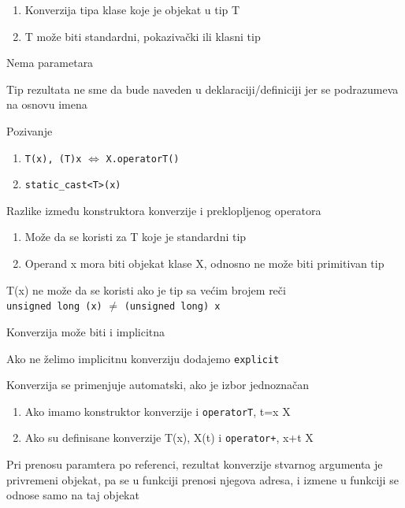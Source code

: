 \documentclass{article}
\newenvironment{xitemize}{%
    
    \itemize
    \larger
}{%
    \enditemize
}
\let\olditemize\itemize
\let\endolditemize\enditemize
\renewenvironment{itemize}{%
    \smaller
    \olditemize
}{%
    \endolditemize
}
\providecommand{\inlinecode}[1]{\texttt{#1}}
\begin{document}
\begin{xitemize}
\begin{itemize}
\item[]\begin{enumerate}
        \item Konverzija tipa klase koje je objekat u tip T
        \item T može biti standardni, pokazivački ili klasni tip
    \end{enumerate} 
    \item Nema parametara
    \item Tip rezultata ne sme da bude naveden u deklaraciji/definiciji jer se podrazumeva na osnovu imena
    \item Pozivanje
    \begin{enumerate}
        \item \inlinecode{T(x), (T)x} $\iff$ \inlinecode{X.operatorT()} 
        \item \inlinecode{static\_cast<T>(x)}
    \end{enumerate}
    \item Razlike između konstruktora konverzije i preklopljenog operatora
    \begin{enumerate}
        \item Može da se koristi za T koje je standardni tip
        \item Operand x mora biti objekat klase X, odnosno ne može biti primitivan tip
    \end{enumerate}
    \item T(x) ne može da se koristi ako je tip sa većim brojem reči\\
    \inlinecode{unsigned long (x)} $\neq$ \inlinecode{(unsigned long) x}
    \item Konverzija može biti i implicitna
    \item Ako ne želimo implicitnu konverziju dodajemo \inlinecode{explicit}
    \item Konverzija se primenjuje automatski, ako je izbor jednoznačan
    \begin{enumerate}
        \item Ako imamo konstruktor konverzije i \inlinecode{operatorT}, t=x X
        \item Ako su definisane konverzije T(x), X(t) i \inlinecode{operator+}, x+t X
    \end{enumerate}
    \item Pri prenosu paramtera po referenci, rezultat konverzije stvarnog argumenta je privremeni objekat, pa se u funkciji prenosi njegova adresa, i izmene u funkciji se odnose samo na taj objekat
    \begin{lstlisting}

\end{lstlisting}
\end{itemize}
\end{xitemize}
\end{document}
